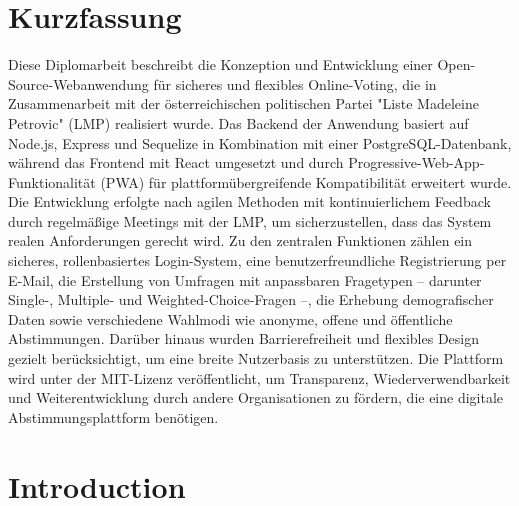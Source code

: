 \documentclass[a4paper,12pt]{report}
\begin{document}
\chapter*{Kurzfassung}
Diese Diplomarbeit beschreibt die Konzeption und Entwicklung einer Open-Source-Webanwendung für sicheres und flexibles Online-Voting, die in Zusammenarbeit mit der österreichischen politischen Partei "Liste Madeleine Petrovic" (LMP) realisiert wurde. Das Backend der Anwendung basiert auf Node.js, Express und Sequelize in Kombination mit einer PostgreSQL-Datenbank, während das Frontend mit React umgesetzt und durch Progressive-Web-App-Funktionalität (PWA) für plattformübergreifende Kompatibilität erweitert wurde. Die Entwicklung erfolgte nach agilen Methoden mit kontinuierlichem Feedback durch regelmäßige Meetings mit der LMP, um sicherzustellen, dass das System realen Anforderungen gerecht wird. Zu den zentralen Funktionen zählen ein sicheres, rollenbasiertes Login-System, eine benutzerfreundliche Registrierung per E-Mail, die Erstellung von Umfragen mit anpassbaren Fragetypen – darunter Single-, Multiple- und Weighted-Choice-Fragen –, die Erhebung demografischer Daten sowie verschiedene Wahlmodi wie anonyme, offene und öffentliche Abstimmungen. Darüber hinaus wurden Barrierefreiheit und flexibles Design gezielt berücksichtigt, um eine breite Nutzerbasis zu unterstützen. Die Plattform wird unter der MIT-Lizenz veröffentlicht, um Transparenz, Wiederverwendbarkeit und Weiterentwicklung durch andere Organisationen zu fördern, die eine digitale Abstimmungsplattform benötigen.
\newpage

\tableofcontents
\newpage

\chapter{Introduction}
\end{document}
